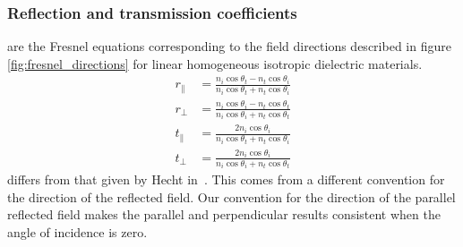\subsubsection{Reflection and transmission coefficients}
 are the Fresnel equations corresponding to the field directions described in figure \cref{fig:fresnel_directions} for linear homogeneous isotropic dielectric materials.
\begin{subequations}
    \begin{align}
        r_\parallel & =
        \frac{n_i \cos \theta_t - n_t \cos \theta_i}{n_i \cos \theta_t + n_t \cos \theta_i}
        \label{eq:fresnel_rp}
        \\
        r_\perp & =
        \frac{n_i \cos \theta_i - n_t \cos \theta_t}{n_i \cos \theta_i + n_t \cos \theta_t}
        \label{eq:fresnel_rs}
        \\
        t_\parallel & =
        \frac {2 n_i \cos \theta_i}{n_i \cos \theta_t + n_t \cos \theta_i}
        \label{eq:fresnel_tp}
        \\
        t_\perp & =
        \frac {2 n_i \cos \theta_i}{n_i \cos \theta_i + n_t \cos \theta_t}
        \label{eq:fresnel_ts}
    \end{align}
    \label{eq:fresnel_oblique}
\end{subequations}
 differs from that given by Hecht in~\cite{hecht2002optics}.
This comes from a different convention for the direction of the reflected field.
Our convention for the direction of the parallel reflected field makes the parallel and perpendicular results consistent when the angle of incidence is zero.

%

